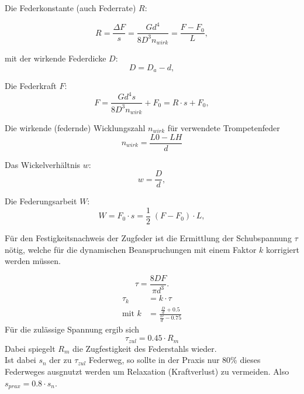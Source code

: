 Die Federkonstante (auch Federrate) $R$:

\begin{equation}
    R=\frac{\Delta F}{s}=\frac{Gd^4}{8D^3n_{wirk}}=\frac{F-F_0}{L},
    \label{eqn:federrate}
\end{equation}

mit der wirkende Federdicke $D$:
\begin{equation}
    D=D_a-d,
\end{equation}

Die Federkraft $F$:
\begin{equation}
    F=\frac{Gd^4s}{8D^3n_{wirk}}+F_0=R \cdot s +F_0,
    \label{eqn:federkraft}
\end{equation}

Die wirkende (federnde) Wicklungszahl $n_{wirk}$ für verwendete Trompetenfeder
\begin{equation}
    n_{wirk}=\frac{L0-LH}{d}    
\end{equation}

Das Wickelverhältnis $w$:
\begin{equation}
    w=\frac{D}{d},
\end{equation}

Die Federungsarbeit $W$:
\begin{equation}
    W=F_0 \cdot s = \frac{1}{2}\;(F-F_0) \cdot L,
    \label{eqn:federungsarbeit}
\end{equation}
\newline




Für den Festigkeitsnachweis der Zugfeder ist die Ermittlung der Schubspannung $\tau$
nötig, welche für die dynamischen Beanspruchungen mit einem Faktor $k$ korrigiert werden müssen.

\begin{equation}
    \tau = \frac{8DF}{\pi d^3}.
    \label{eqn:schubspannung}
\end{equation}
\begin{align}
    \tau_k &= k \cdot \tau\\
    \text{mit }k&=\frac{\frac{D}{d}+0.5}{\frac{D}{d}-0.75}
\end{align}
Für die zulässige Spannung ergib sich
\begin{equation}
    \tau_{zul}=0.45 \cdot R_m
\end{equation}
Dabei spiegelt $R_m$ die Zugfestigkeit des Federstahls wieder.\\
Ist dabei $s_n$ der zu $\tau_{zul}$ Federweg, so sollte in der Praxis nur 80\% dieses
Federweges ausgnutzt werden um Relaxation (Kraftverlust) zu vermeiden.
Also $s_{prax}=0.8 \cdot s_n$.  



\label{sec:theorie}